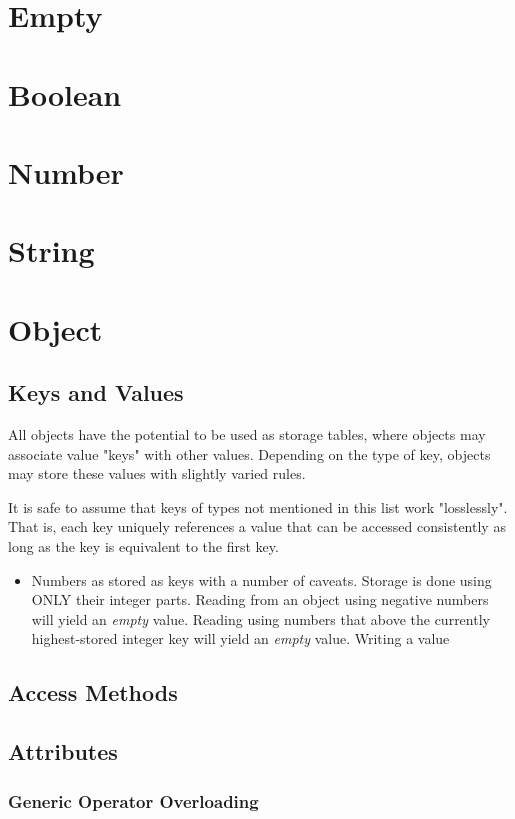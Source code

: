 \documentclass[12pt,letterpaper]{report}
\begin{document}
\section{Empty}
\section{Boolean}
\section{Number}
\section{String}
\section{Object}
\subsection{Keys and Values}  

All objects have the potential to be used as storage tables, where objects may associate 
value "keys" with other values. Depending on the type of key, objects may store these values 
with slightly varied rules. 

It is safe to assume that keys of types not mentioned in this list work "losslessly". That is, 
each key uniquely references a value that can be accessed consistently as long as the 
key is equivalent to the first key.

\begin{itemize}
  \item Numbers as stored as keys with a number of caveats. Storage is 
  done using ONLY their integer parts. Reading from an object using negative numbers will yield an \textit{empty} 
  value. Reading using numbers that above the currently highest-stored integer key will yield an 
  \textit{empty} value. Writing a value
\end{itemize}


\subsection{Access Methods}
  
\subsection{Attributes}
\subsubsection{Generic Operator Overloading}    
\end{document}
